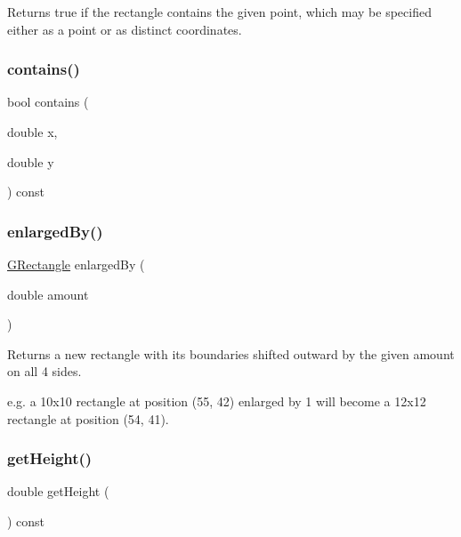 Returns {\ttfamily true} if the rectangle contains the given point, which may be specified either as a point or as distinct coordinates. 

\mbox{\label{classGRectangle_abb6a5d7c03e6eaaae97264c4799ce7c3}} 
\subsubsection{\texorpdfstring{contains()}{contains()}\hspace{0.1cm}{\footnotesize\ttfamily [2/2]}}
{\footnotesize\ttfamily bool contains (\begin{DoxyParamCaption}\item[{double}]{x,  }\item[{double}]{y }\end{DoxyParamCaption}) const}

\mbox{\label{classGRectangle_adddb08ead701a5144949ca673a44292c}} 
\subsubsection{\texorpdfstring{enlarged\+By()}{enlargedBy()}}
{\footnotesize\ttfamily \mbox{\hyperlink{classGRectangle}{G\+Rectangle}} enlarged\+By (\begin{DoxyParamCaption}\item[{double}]{amount }\end{DoxyParamCaption})}



Returns a new rectangle with its boundaries shifted outward by the given amount on all 4 sides. 

e.\+g. a 10x10 rectangle at position (55, 42) enlarged by 1 will become a 12x12 rectangle at position (54, 41). \mbox{\label{classGRectangle_a1e7e353362434072875264cf95629f99}} 
\subsubsection{\texorpdfstring{get\+Height()}{getHeight()}}
{\footnotesize\ttfamily double get\+Height (\begin{DoxyParamCaption}{ }\end{DoxyParamCaption}) const}



